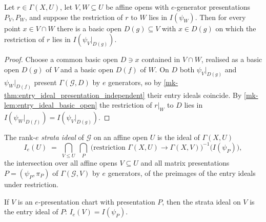 \begin{lemma}
  \label{mk-lem:entry_ideal_chart_transfer}
  \leanok

  Let \(r \in \Gamma(X, U)\), let \(V, W \subseteq U\) be affine opens with
  \(e\)-generator presentations \(P_V, P_W\), and suppose the restriction of
  \(r\) to \(W\) lies in \(I(\psi_W)\).  Then for every point
  \(x \in V \cap W\) there is a basic open \(D(g) \subseteq V\) with
  \(x \in D(g)\) on which the restriction of \(r\) lies in
  \(I(\psi_V|_{D(g)})\).
\end{lemma}

\begin{proof}
  \leanok
  Choose a common basic open \(D \ni x\) contained in \(V \cap W\), realised
  as a basic open \(D(g)\) of \(V\) and a basic open \(D(f)\) of \(W\).  On
  \(D\) both \(\psi_V|_{D(g)}\) and \(\psi_W|_{D(f)}\) present
  \(\Gamma(\mathcal G, D)\) by \(e\) generators, so by
  \ref{mk-thm:entry_ideal_presentation_independent} their entry ideals coincide.
  By \ref{mk-lem:entry_ideal_basic_open} the restriction of \(r|_W\) to \(D\)
  lies in \(I(\psi_W|_{D(f)}) = I(\psi_V|_{D(g)})\).
\end{proof}

\begin{definition}
  \label{mk-def:strata_ideal}
  \leanok

  The rank-\(e\) \emph{strata ideal} of \(\mathcal G\) on an affine open \(U\)
  is the ideal of \(\Gamma(X, U)\)
  \[
    I_e(U) \;=\; \bigcap_{V \le U} \; \bigcap_{P}
      \; \bigl(\text{restriction } \Gamma(X, U) \to \Gamma(X, V)\bigr)^{-1}
        \bigl(I(\psi_P)\bigr),
  \]
  the intersection over all affine opens \(V \subseteq U\) and all matrix
  presentations \(P = (\psi_P, \pi_P)\) of \(\Gamma(\mathcal G, V)\) by \(e\)
  generators, of the preimages of the entry ideals under restriction.
\end{definition}

\begin{theorem}
  \label{mk-thm:strata_ideal_eq_entry_ideal}
  \leanok

  If \(V\) is an \(e\)-presentation chart with presentation \(P\), then the
  strata ideal on \(V\) is the entry ideal of \(P\): \(I_e(V) = I(\psi_P)\).
\end{theorem}


